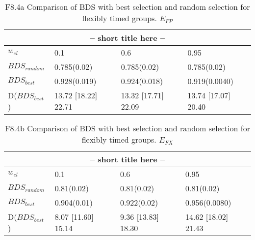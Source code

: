 \clearpage
\begin{landscape}
\begin{table}[h]
\label{at:xx}
\begin{center}
\begin{tabular}{llll}
\toprule
\multicolumn{4}{c}{-- short title here --}\\
\midrule
$w_{el}$ & 0.1 & 0.6 & 0.95\\
\midrule
$BDS_{random}$ & 0.785(0.02) & 0.785(0.02) & 0.785(0.02)\\
\midrule
$BDS_{best}$ & 0.928(0.019) & 0.924(0.018) & 0.919(0.0040)\\
D($BDS_{best}$) & 13.72 [18.22] 22.71 & 13.32 [17.71] 22.09 & 13.74 [17.07] 20.40\\
\bottomrule
\end{tabular}
\end{center}
\caption{F8.4a Comparison of BDS with best selection and random selection for flexibly timed groups. $E_{FP}$}
\end{table}
\end{landscape}


\clearpage
\begin{landscape}
\begin{table}[h]
\label{at:xx}
\begin{center}
\begin{tabular}{llll}
\toprule
\multicolumn{4}{c}{-- short title here --}\\
\midrule
$w_{el}$ & 0.1 & 0.6 & 0.95\\
\midrule
$BDS_{random}$ & 0.81(0.02) & 0.81(0.02) & 0.81(0.02)\\
\midrule
$BDS_{best}$ & 0.904(0.01) & 0.922(0.02) & 0.956(0.0080)\\
D($BDS_{best}$) & 8.07 [11.60] 15.14 & 9.36 [13.83] 18.30 & 14.62 [18.02] 21.43\\
\bottomrule
\end{tabular}
\end{center}
\caption{F8.4b Comparison of BDS with best selection and random selection for flexibly timed groups. $E_{FX}$}
\end{table}
\end{landscape}



